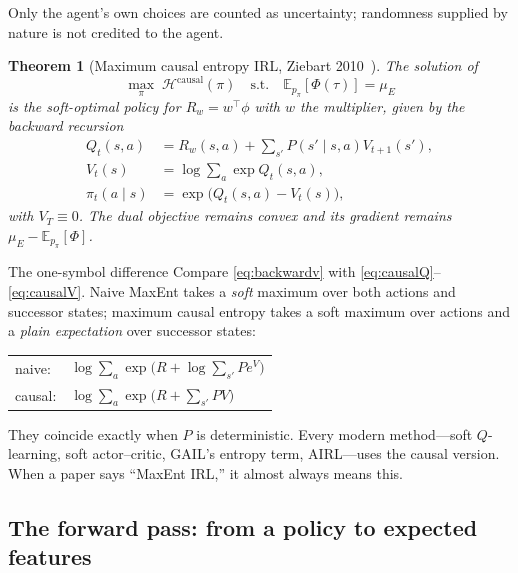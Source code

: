 \documentclass[11pt]{article}
\theoremstyle{plain}
\newtheorem{theorem}{Theorem}[section]
\theoremstyle{definition}
\theoremstyle{remark}
\newcommand{\E}{\mathbb{E}}
\begin{document}
Only the agent's own choices are counted as uncertainty; randomness
supplied by nature is not credited to the agent.

\begin{theorem}[Maximum causal entropy IRL, Ziebart
2010~\cite{ziebart2010thesis}]\label{thm:maxcausal}
The solution of
\begin{equation}
\max_\pi \; \mathcal{H}^{\mathrm{causal}}(\pi) \quad \text{s.t.}\quad
\E_{p_\pi}[\Phi(\tau)] = \mu_E
\label{eq:maxcausalprogram}
\end{equation}
is the soft-optimal policy for $R_w=w^\top\phi$ with $w$ the multiplier,
given by the backward recursion
\begin{align}
Q_t(s,a) &= R_w(s,a) + \sum_{s'} P(s'\mid s,a) V_{t+1}(s'), \label{eq:causalQ}\\
V_t(s) &= \log\sum_a \exp Q_t(s,a), \label{eq:causalV}\\
\pi_t(a\mid s) &= \exp\big(Q_t(s,a) - V_t(s)\big), \label{eq:causalpi}
\end{align}
with $V_T\equiv0$. The dual objective remains convex and its gradient
remains $\mu_E - \E_{p_\pi}[\Phi]$.
\end{theorem}

\begin{graybox}{The one-symbol difference}
Compare \eqref{eq:backwardv} with \eqref{eq:causalQ}--\eqref{eq:causalV}.
Naive MaxEnt takes a \emph{soft} maximum over both actions and successor
states; maximum causal entropy takes a soft maximum over actions and a
\emph{plain expectation} over successor states:
\begin{center}
\begin{tabular}{@{}ll@{}}
naive: & $\log\sum_a \exp\big(R + \log\sum_{s'} P e^V\big)$\\
causal: & $\log\sum_a \exp\big(R + \sum_{s'} P V\big)$
\end{tabular}
\end{center}
They coincide exactly when $P$ is deterministic. Every modern method---soft
$Q$-learning, soft actor--critic, GAIL's entropy term, AIRL---uses the
causal version. When a paper says ``MaxEnt IRL,'' it almost always means
this.
\end{graybox}

\subsection{The forward pass: from a policy to expected features}
\label{sec:forwardpass}
\end{document}
